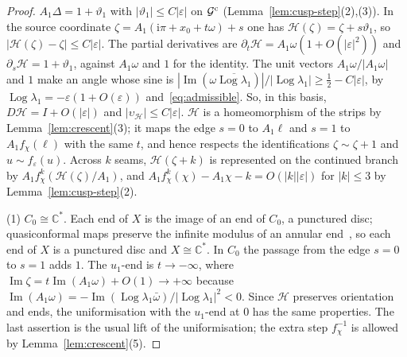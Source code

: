 \documentclass[11pt]{amsart}
\theoremstyle{definition}
\newcommand{\ii}{\mathrm{i}}
\begin{document}
\begin{proof}
$A_1\Delta=1+\vartheta_1$ with $|\vartheta_1|\le C|\varepsilon|$ on $\mathcal G^{\rm c}$
(Lemma~\ref{lem:cusp-step}(2),(3)).  In the source coordinate
$\zeta=A_1(\ii\pi+x_0+t\omega)+s$ one has $\mathcal H(\zeta)=\zeta+s\vartheta_1$, so
$|\mathcal H(\zeta)-\zeta|\le C|\varepsilon|$.  The partial derivatives are
$\partial_t\mathcal H=A_1\omega(1+O(|\varepsilon|^2))$ and $\partial_s\mathcal H=1+\vartheta_1$, against
$A_1\omega$ and $1$ for the identity.  The unit vectors $A_1\omega/|A_1\omega|$ and $1$
make an angle whose sine is
$|\operatorname{Im}(\omega\overline{\operatorname{Log}\lambda_1})|/|\operatorname{Log}\lambda_1|\ge\tfrac12-C|\varepsilon|$, by
$\operatorname{Log}\lambda_1=-\varepsilon(1+O(\varepsilon))$ and~\eqref{eq:admissible}.  So, in this basis,
$D\mathcal H=I+O(|\varepsilon|)$ and $|\upsilon_{\mathcal H}|\le C|\varepsilon|$.  $\mathcal H$ is a homeomorphism
of the strips by Lemma~\ref{lem:crescent}(3); it maps the edge $s=0$ to
$A_1\ell$ and $s=1$ to $A_1f_\chi(\ell)$ with the same $t$, and hence respects the
identifications $\zeta\sim\zeta+1$ and $u\sim f_\varepsilon(u)$.  Across $k$ seams,
$\mathcal H(\zeta+k)$ is represented on the continued branch by
$A_1f_\chi^k(\mathcal H(\zeta)/A_1)$, and $A_1f_\chi^k(\chi)-A_1\chi-k=O(|k||\varepsilon|)$ for
$|k|\le3$ by Lemma~\ref{lem:cusp-step}(2).

(1) $C_0\cong\mathbb C^*$.  Each end of $X$ is the image of an end of $C_0$, a
punctured disc; quasiconformal maps preserve the infinite modulus of an
annular end~\cite{LehtoVirtanen}, so each end of $X$ is a punctured disc and
$X\cong\mathbb C^*$.  In $C_0$ the passage from the edge $s=0$ to $s=1$ adds $1$.
The $u_1$-end is $t\to-\infty$, where
$\operatorname{Im}\zeta=t\operatorname{Im}(A_1\omega)+O(1)\to+\infty$ because
$\operatorname{Im}(A_1\omega)=-\operatorname{Im}(\operatorname{Log}\lambda_1\bar\omega)/|\operatorname{Log}\lambda_1|^2<0$.  Since $\mathcal H$
preserves orientation and ends, the uniformisation with the $u_1$-end at $0$
has the same properties.  The last assertion is the usual lift of the
uniformisation; the extra step $f_\chi^{-1}$ is allowed by Lemma~\ref{lem:crescent}(5).


\end{proof}
\end{document}

